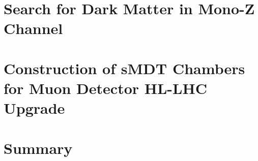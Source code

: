 \documentclass[degree=doctor,language=english]{ustcthesis}
\begin{document}
\chapter{Search for Dark Matter in Mono-Z Channel}
\label{chap:monoZ}

\clearpage

\chapter{Construction of sMDT Chambers for Muon Detector HL-LHC Upgrade}
\label{chap:sMDT}

\clearpage

\chapter{Summary}
\label{chap:sum}




\printbibliography

\appendix


\backmatter


% 
\end{document}
